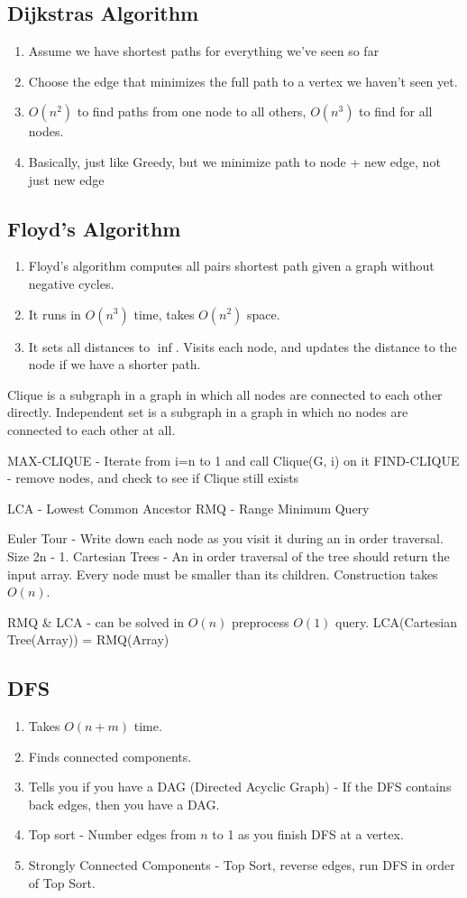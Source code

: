 \documentclass[12pt,twocolumn]{article}
\begin{document}
\subsection{Dijkstras Algorithm}
\begin{enumerate}
    \item Assume we have shortest paths for everything we've seen so far
    \item Choose the edge that minimizes the full path to a vertex we haven't seen yet.
    \item $O(n^2)$ to find paths from one node to all others, $O(n^3)$ to find for all nodes.
    \item Basically, just like Greedy, but we minimize path to node + new edge, not just new edge
\end{enumerate}

\subsection{Floyd's Algorithm}
\begin{enumerate}
    \item Floyd's algorithm computes all pairs shortest path given a graph without negative cycles.
    \item It runs in $O(n^3)$ time, takes $O(n^2)$ space.
    \item It sets all distances to $\inf$. Visits each node, and updates the distance to the node if we have a shorter path.
\end{enumerate}

Clique is a subgraph in a graph in which all nodes are connected to each other directly.
Independent set is a subgraph in a graph in which no nodes are connected to each other at all.

MAX-CLIQUE - Iterate from i=n to 1 and call Clique(G, i) on it
FIND-CLIQUE - remove nodes, and check to see if Clique still exists

LCA - Lowest Common Ancestor
RMQ - Range Minimum Query

Euler Tour - Write down each node as you visit it during an in order traversal. Size 2n - 1.
Cartesian Trees - An in order traversal of the tree should return the input array. Every node must be smaller than its children. Construction takes $O(n)$.

RMQ \& LCA - can be solved in $O(n)$ preprocess $O(1)$ query. LCA(Cartesian Tree(Array)) = RMQ(Array)

\subsection{DFS}
\begin{enumerate}
    \item Takes $O(n+m)$ time.
    \item Finds connected components.
    \item Tells you if you have a DAG (Directed Acyclic Graph) - If the DFS contains back edges, then you have a DAG.
    \item Top sort - Number edges from $n$ to 1 as you finish DFS at a vertex.
    \item Strongly Connected Components - Top Sort, reverse edges, run DFS in order of Top Sort.
\end{enumerate}
\end{document}
